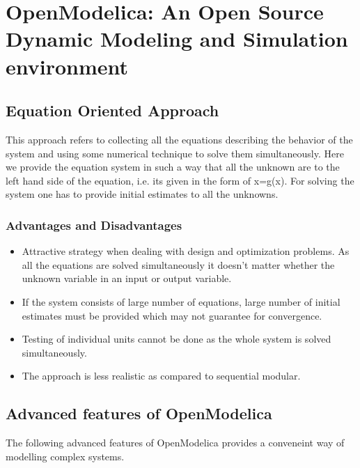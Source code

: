 \documentclass[12pt]{report}
\begin{document}
\chapter{OpenModelica: An Open Source Dynamic Modeling and Simulation environment}

\section{Equation Oriented Approach}
This approach refers to collecting all the equations describing the behavior of the system and using some numerical technique to solve them simultaneously. Here we provide the equation system in such a way that all the unknown are to the left hand side of the equation, i.e. its given in the form of x=g(x). For solving the system one has to provide initial estimates to all the unknowns.

\subsection{Advantages and Disadvantages}
\begin{itemize}
\item {Attractive strategy when dealing with design and optimization problems. As all the equations are solved simultaneously it doesn't  matter whether the unknown variable in an input or output variable.}
\item{If the system consists of large number of equations, large number of initial estimates must be provided which may not guarantee for convergence.}
\item{Testing of individual units cannot be done as the whole system is solved simultaneously.}
\item{The approach is less realistic as compared to sequential modular.}
\end{itemize}


\section{Advanced features of OpenModelica}
The following advanced features of OpenModelica provides a conveneint way of modelling complex systems.  
\end{document}
